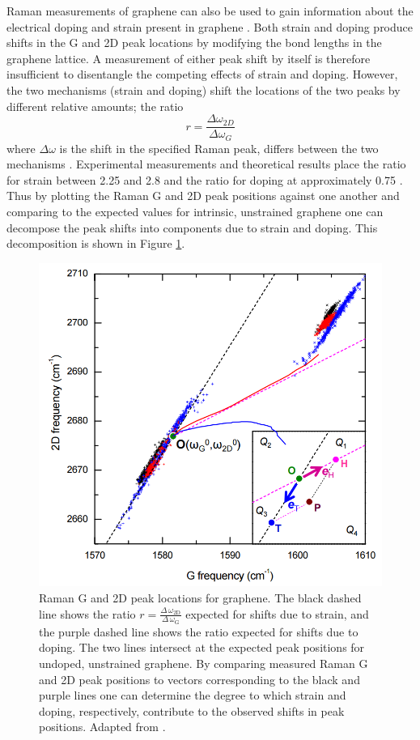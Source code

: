 \documentclass[edeposit,fullpage,draftthesis]{uiucthesis2009}
\begin{document}
        Raman measurements of graphene can also be used to gain information about the electrical doping
        and strain present in graphene \cite{lee2012optical}. Both strain and doping produce shifts
        in the G and 2D peak locations by modifying the bond lengths in the graphene lattice. 
        A measurement of either peak shift by itself is therefore insufficient to disentangle the competing effects
        of strain and doping. However, the two mechanisms (strain and doping) shift the locations of the two
        peaks by different relative amounts; the ratio
        $$
        r = \frac{\Delta \omega_{2D}}{\Delta \omega_G}
        $$
        where $\Delta \omega$ is the shift in the specified Raman peak, differs between the two mechanisms \cite{lee2012optical}.
        Experimental measurements \cite{zabel2012raman, metzger2009biaxial, ding2010stretchable} and theoretical \cite{mohr2010splitting, mohiuddin2009uniaxial} results place the ratio for strain between 2.25 and 2.8 and the ratio for doping at approximately 0.75 \cite{lee2012optical}.
        Thus by plotting the Raman G and 2D peak positions against one another and comparing to the expected
        values for intrinsic, unstrained graphene one can decompose the peak shifts into components due to
        strain and doping\cite{lee2012optical}. This decomposition is shown in Figure \ref{fig:raman_decomposition}.
        
        \begin{figure}
            \centering
            \includegraphics[width=0.5\linewidth]{images/experimentaltechniques/lee2012_raman.png}
            \caption[Graphene G vs 2D peak positions for strain and doping]{
                Raman G and 2D peak locations for graphene.
                The black dashed line shows the ratio 
                $r = \frac{\Delta \, \omega_\text{2D}}{\Delta \, \omega_\text{G}}$ expected for shifts due to
                strain, and the purple dashed line shows the ratio expected for shifts due to doping.
                The two lines intersect at the expected peak positions for undoped, unstrained graphene.
                By comparing measured Raman G and 2D peak positions to vectors corresponding to the
                black and purple lines one can determine the degree to which strain and doping, respectively,
                contribute to the observed shifts in peak positions.
                Adapted from \cite{lee2012optical}.
                }
            \label{fig:raman_decomposition}
        \end{figure}
        
\end{document}
